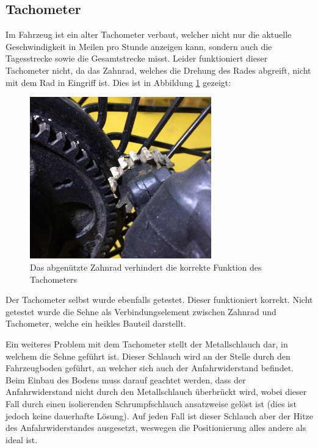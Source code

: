 \subsection{Tachometer}
Im Fahrzeug ist ein alter Tachometer verbaut, welcher nicht nur die aktuelle Geschwindigkeit in Meilen pro Stunde anzeigen kann, sondern auch die Tagesstrecke sowie die Gesamtstrecke misst. Leider funktioniert dieser Tachometer nicht, da das Zahnrad, welches die Drehung des Rades abgreift, nicht mit dem Rad in Eingriff ist. Dies ist in Abbildung \ref{fig:Zahnrad} gezeigt:

\begin{figure}[h]
	\centering
		\includegraphics[width=0.70\textwidth]{images/Zahnrad.jpg}
	\caption{Das abgenützte Zahnrad verhindert die korrekte Funktion des Tachometers}
	\label{fig:Zahnrad}
\end{figure}

Der Tachometer selbst wurde ebenfalls getestet. Dieser funktioniert korrekt. Nicht getestet wurde die Sehne als Verbindungselement zwischen Zahnrad und Tachometer, welche ein heikles Bauteil darstellt.

Ein weiteres Problem mit dem Tachometer stellt der Metallschlauch dar, in welchem die Sehne geführt ist. Dieser Schlauch wird an der Stelle durch den Fahrzeugboden geführt, an welcher sich auch der Anfahrwiderstand befindet. Beim Einbau des Bodens muss darauf geachtet werden, dass der Anfahrwiderstand nicht durch den Metallschlauch überbrückt wird, wobei dieser Fall durch einen isolierenden Schrumpfschlauch ansatzweise gelöst ist (dies ist jedoch keine dauerhafte Lösung). Auf jeden Fall ist dieser Schlauch aber der Hitze des Anfahrwiderstandes ausgesetzt, weswegen die Positionierung alles andere als ideal ist.

